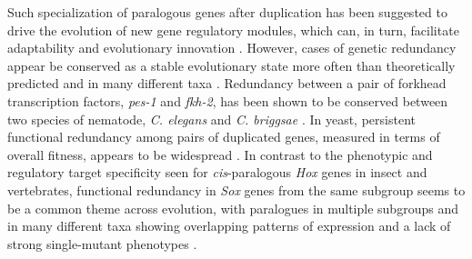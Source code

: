 Such specialization of paralogous genes after duplication has been suggested to drive the evolution of new gene regulatory modules, which can, in turn, facilitate adaptability and evolutionary innovation \citep{espinosa-soto_specialization_2010}. However, cases of genetic redundancy appear be conserved as a stable evolutionary state more often than theoretically predicted and in many different taxa \citep{lynch_probability_2001,vavouri_widespread_????}. Redundancy between a pair of forkhead transcription factors, \emph{pes-1} and \emph{fkh-2}, has been shown to be conserved between two species of nematode, \emph{C. elegans} and \emph{C. briggsae} \citep{molin_evolutionary_2000}. In yeast, persistent functional redundancy among pairs of duplicated genes, measured in terms of overall fitness, appears to be widespread \citep{dean_pervasive_2008}. In contrast to the phenotypic and regulatory target specificity seen for \emph{cis}-paralogous \emph{Hox} genes in insect and vertebrates, functional redundancy in \emph{Sox} genes from the same subgroup seems to be a common theme across evolution, with paralogues in multiple subgroups and in many different taxa showing overlapping patterns of expression and a lack of strong single-mutant phenotypes \citep{bhattaram_organogenesis_2010,buescher_formation_2002,ferri_sox2_2004,guth_having_2008,matsui_redundant_2006,nishiguchi_sox1_1998,okuda_b1_2010,overton_evidence_2002,rizzoti_sox3_2004,uchikawa_b1_2011,uwanogho_embryonic_1995,wegner_stem_2005,wood_comparative_1999}.\\ 

